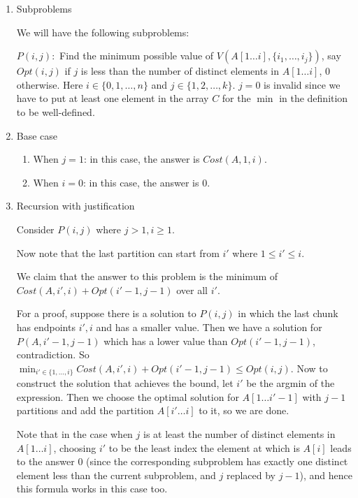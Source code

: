 \begin{enumerate}

\item Subproblems

We will have the following subproblems:

        $P(i, j):$ Find the minimum possible value of $V(A[1\ldots i], \{i_1, \ldots, i_j\})$, say $Opt(i, j)$ if $j$ is less than the number of distinct elements in $A[1\ldots i]$, 0 otherwise. Here $i \in \{0, 1, \ldots, n\}$ and $j \in \{1, 2, \ldots, k\}$. $j = 0$ is invalid since we have to put at least one element in the array $C$ for the $\min$ in the definition to be well-defined.

\item Base case

    \begin{enumerate}
    \item When $j = 1$: in this case, the answer is $Cost(A, 1, i)$.
    \item When $i = 0$: in this case, the answer is $0$.
    \end{enumerate}

\item Recursion with justification

        Consider $P(i, j)$ where $j > 1, i \ge 1$.

        Now note that the last partition can start from $i'$ where $1 \le i' \le i$.

        We claim that the answer to this problem is the minimum of $Cost(A, i', i) + Opt(i' - 1, j - 1)$ over all $i'$. 

        For a proof, suppose there is a solution to $P(i, j)$ in which the last chunk has endpoints $i', i$ and has a smaller value. Then we have a solution for $P(A, i' - 1, j - 1)$ which has a lower
        value than $Opt(i' - 1, j - 1)$, contradiction. So $\min_{i' \in \{1, \ldots, i\}} Cost(A, i', i) + Opt(i' - 1, j - 1) \le Opt(i, j)$. Now to construct the solution that achieves the bound,
        let $i'$ be the argmin of the expression. Then we choose the optimal solution for $A[1\ldots i'-1]$ with $j - 1$ partitions and add the partition $A[i' \ldots i]$ to it, so we are done.
        
        Note that in the case when $j$ is at least the number of distinct elements in $A[1\ldots i]$, choosing $i'$ to be the least index the element at which is $A[i]$ leads to the answer $0$ (since the corresponding subproblem has exactly one distinct element less than the current subproblem, and $j$ replaced by $j - 1$), and hence this formula works in this case too.
        

\end{enumerate}
